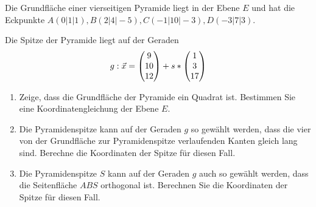  Die Grundfläche einer vierseitigen Pyramide liegt in der Ebene $E$ und hat die Eckpunkte $A(0|1|1),B(2|4|-5),C(-1|10|-3),D(-3|7|3)$.\cas

Die Spitze der Pyramide liegt auf der Geraden
\begin{equation*}
	g:\vec x=\begin{pmatrix} 9\\10\\12 \end{pmatrix}+s*\begin{pmatrix} 1\\3\\17 \end{pmatrix}
\end{equation*}
\begin{enumerate}
	\item Zeige, dass die Grundfläche der Pyramide ein Quadrat ist. Bestimmen Sie eine Koordinatengleichung der Ebene $E$.
	\item Die Pyramidenspitze kann auf der Geraden $g$ so gewählt werden, dass die vier von der Grundfläche zur Pyramidenspitze verlaufenden Kanten gleich lang sind. Berechne die Koordinaten der Spitze für diesen Fall.
	\item Die Pyramidenspitze $S$ kann auf der Geraden $g$ auch so gewählt werden, dass die Seitenfläche $ABS$ orthogonal ist. Berechnen Sie die Koordinaten der Spitze für diesen Fall.
\end{enumerate}
